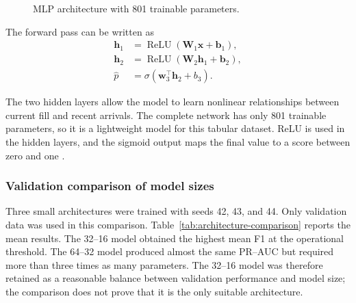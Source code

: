 \documentclass[10pt]{article}
\begin{document}
\begin{figure}[H]
\centering
{}
\caption{MLP architecture with 801 trainable parameters.}
\label{fig:architecture}
\end{figure}

The forward pass can be written as
\begin{align}
\mathbf{h}_1 &= \operatorname{ReLU}(\mathbf{W}_1\mathbf{x}+\mathbf{b}_1),\\
\mathbf{h}_2 &= \operatorname{ReLU}(\mathbf{W}_2\mathbf{h}_1+\mathbf{b}_2),\\
\hat{p} &= \sigma(\mathbf{w}_3^\top\mathbf{h}_2+b_3).
\end{align}

The two hidden layers allow the model to learn nonlinear relationships between current fill and recent arrivals. The complete network has only 801 trainable parameters, so it is a lightweight model for this tabular dataset. ReLU is used in the hidden layers, and the sigmoid output maps the final value to a score between zero and one \citep{glorot2010,rumelhart1986}.

\subsubsection{Validation comparison of model sizes}

Three small architectures were trained with seeds 42, 43, and 44. Only validation data was used in this comparison. Table~\ref{tab:architecture-comparison} reports the mean results. The 32--16 model obtained the highest mean F1 at the operational threshold. The 64--32 model produced almost the same PR--AUC but required more than three times as many parameters. The 32--16 model was therefore retained as a reasonable balance between validation performance and model size; the comparison does not prove that it is the only suitable architecture.
\end{document}
